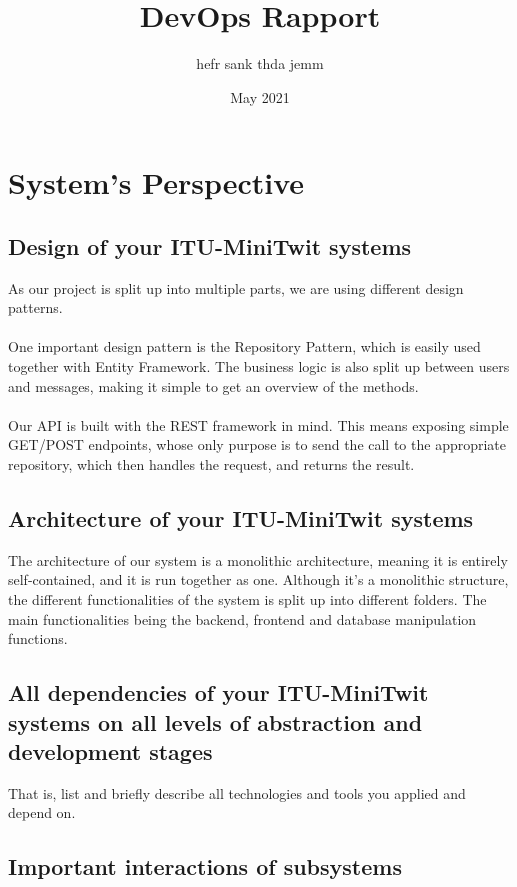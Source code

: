 \documentclass{article}
\title{DevOps Rapport}
\author{hefr sank thda jemm}
\date{May 2021}
\begin{document}
\maketitle

\section{System's Perspective}

\subsection{Design of your ITU-MiniTwit systems}
As our project is split up into multiple parts, we are using different design patterns.
\\\\
One important design pattern is the Repository Pattern, which is easily used together with Entity Framework. The business logic is also split up between users and messages, making it simple to get an overview of the methods.
\\\\
Our API is built with the REST framework in mind. This means exposing simple GET/POST endpoints, whose only purpose is to send the call to the appropriate repository, which then handles the request, and returns the result.

\subsection{Architecture of your ITU-MiniTwit systems}
The architecture of our system is a monolithic architecture, meaning it is entirely self-contained, and it is run together as one. Although it's a monolithic structure, the different functionalities of the system is split up into different folders. The main functionalities being the backend, frontend and database manipulation functions.

\subsection{All dependencies of your ITU-MiniTwit systems on all levels of abstraction and development stages}
That is, list and briefly describe all technologies and tools you applied and depend on.

\subsection{Important interactions of subsystems}
\end{document}
